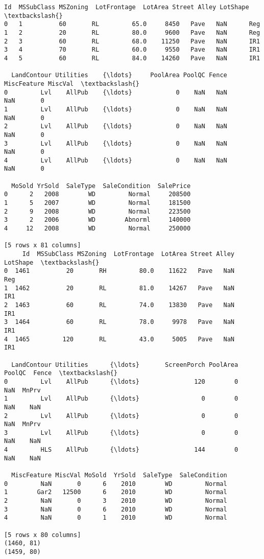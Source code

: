 \documentclass[11pt]{article}
\begin{document}
    \begin{Verbatim}[commandchars=\\\{\}]
   Id  MSSubClass MSZoning  LotFrontage  LotArea Street Alley LotShape  \textbackslash{}
0   1          60       RL         65.0     8450   Pave   NaN      Reg   
1   2          20       RL         80.0     9600   Pave   NaN      Reg   
2   3          60       RL         68.0    11250   Pave   NaN      IR1   
3   4          70       RL         60.0     9550   Pave   NaN      IR1   
4   5          60       RL         84.0    14260   Pave   NaN      IR1   

  LandContour Utilities    {\ldots}     PoolArea PoolQC Fence MiscFeature MiscVal  \textbackslash{}
0         Lvl    AllPub    {\ldots}            0    NaN   NaN         NaN       0   
1         Lvl    AllPub    {\ldots}            0    NaN   NaN         NaN       0   
2         Lvl    AllPub    {\ldots}            0    NaN   NaN         NaN       0   
3         Lvl    AllPub    {\ldots}            0    NaN   NaN         NaN       0   
4         Lvl    AllPub    {\ldots}            0    NaN   NaN         NaN       0   

  MoSold YrSold  SaleType  SaleCondition  SalePrice  
0      2   2008        WD         Normal     208500  
1      5   2007        WD         Normal     181500  
2      9   2008        WD         Normal     223500  
3      2   2006        WD        Abnorml     140000  
4     12   2008        WD         Normal     250000  

[5 rows x 81 columns]
     Id  MSSubClass MSZoning  LotFrontage  LotArea Street Alley LotShape  \textbackslash{}
0  1461          20       RH         80.0    11622   Pave   NaN      Reg   
1  1462          20       RL         81.0    14267   Pave   NaN      IR1   
2  1463          60       RL         74.0    13830   Pave   NaN      IR1   
3  1464          60       RL         78.0     9978   Pave   NaN      IR1   
4  1465         120       RL         43.0     5005   Pave   NaN      IR1   

  LandContour Utilities      {\ldots}       ScreenPorch PoolArea PoolQC  Fence  \textbackslash{}
0         Lvl    AllPub      {\ldots}               120        0    NaN  MnPrv   
1         Lvl    AllPub      {\ldots}                 0        0    NaN    NaN   
2         Lvl    AllPub      {\ldots}                 0        0    NaN  MnPrv   
3         Lvl    AllPub      {\ldots}                 0        0    NaN    NaN   
4         HLS    AllPub      {\ldots}               144        0    NaN    NaN   

  MiscFeature MiscVal MoSold  YrSold  SaleType  SaleCondition  
0         NaN       0      6    2010        WD         Normal  
1        Gar2   12500      6    2010        WD         Normal  
2         NaN       0      3    2010        WD         Normal  
3         NaN       0      6    2010        WD         Normal  
4         NaN       0      1    2010        WD         Normal  

[5 rows x 80 columns]
(1460, 81)
(1459, 80)

    \end{Verbatim}
\end{document}
